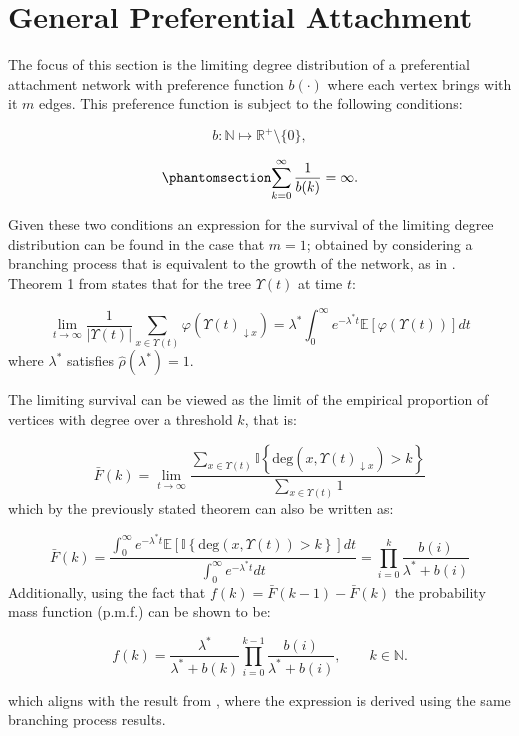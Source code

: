 \documentclass[
  sn-basic,
]{sn-jnl}
\theoremstyle{plain}
\theoremstyle{remark}
\begin{document}
\section{General Preferential Attachment}\label{sec-gpa}

The focus of this section is the limiting degree distribution of a
preferential attachment network with preference function \(b(\cdot)\)
where each vertex brings with it \(m\) edges. This preference function
is subject to the following conditions:

\[
b:\mathbb N \mapsto \mathbb R^+\setminus\{0\},
\]

\begin{equation}\phantomsection\label{eq-condb2}{
\sum_{k=0}^\infty\frac{1}{b(k)} = \infty.
}\end{equation}

Given these two conditions an expression for the survival of the
limiting degree distribution can be found in the case that \(m=1\);
obtained by considering a branching process that is equivalent to the
growth of the network, as in \citep{rudas07}. Theorem 1 from
\citep{rudas07} states that for the tree \(\Upsilon(t)\) at time \(t\):

\[
\lim_{t\rightarrow\infty}\frac{1}{|\Upsilon(t)|}\sum_{x\in\Upsilon(t)}\varphi(\Upsilon(t)_{\downarrow x}) = \lambda^* \int_0^\infty e^{-\lambda^* t}\mathbb E\left[\varphi(\Upsilon(t))\right]dt
\] where \(\lambda^*\) satisfies \(\hat\rho(\lambda^*)=1\).

The limiting survival can be viewed as the limit of the empirical
proportion of vertices with degree over a threshold \(k\), that is:

\[
\bar F(k) = \lim_{t\rightarrow\infty}\frac{\sum_{x\in\Upsilon(t)}\mathbb I\left\{\text{deg}(x,\Upsilon(t)_{\downarrow x})>k\right\}}{\sum_{x\in\Upsilon(t)} 1}
\] which by the previously stated theorem can also be written as:

\[
\bar F(k) = \frac{\int_0^\infty e^{-\lambda^* t}\mathbb E\left[\mathbb I\left\{\text{deg}(x,\Upsilon(t))>k\right\}\right]dt}{\int_0^\infty e^{-\lambda^* t}dt} = \prod_{i=0}^k\frac{b(i)}{\lambda^* + b(i)}
\] Additionally, using the fact that \(f(k) = \bar F(k-1) - \bar F(k)\)
the probability mass function (p.m.f.) can be shown to be:

\[
f(k) = \frac{\lambda^*}{\lambda^* + b(k)}\prod_{i=0}^{k-1}\frac{b(i)}{\lambda^*+b(i)},\qquad k\in\mathbb N.
\]

which aligns with the result from \citep{rudas07}, where the expression
is derived using the same branching process results.
\end{document}
